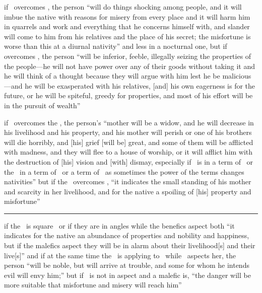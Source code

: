 \begin{description}[style=multiline,leftmargin=1.5cm]
\item[\Mars\Square\Mercury] if \Mars\, overcomes \Mercury, the person ``will do things shocking among people, and it will imbue the native with reasons for misery from every place and it will harm him in quarrels and work and everything that he concerns himself with, and slander will come to him from his relatives and the place of his secret; the misfortune is worse than this at a diurnal nativity'' and less in a nocturnal one, but if \Mercury\, overcomes \Mars, the person ``will be inferior, feeble, illegally seizing the properties of the people---he will not have power over any of their goods without taking it and he will think of a thought because they will argue with him lest he be malicious---and he will be exasperated with his relatives, [and] his own eagerness is for the future, or he will be spiteful, greedy for properties, and most of his effort will be in the pursuit of wealth''

\item[\Mars\Square\Moon] if \Mars\, overcomes the \Moon, the person's ``mother will be a widow, and he will decrease in his livelihood and his property, and his mother will perish or one of his brothers will die horribly, and [his] grief [will be] great, and some of them will be afflicted with madness, and they will flee to a house of worship, or it will afflict him with the destruction of [his] vision and [with] dismay, especially if \Mars\, is in a term of \Saturn\, or the \Moon\, in a term of \Mercury\, or a term of \Mars\, as sometimes the power of the terms changes nativities'' but if the \Moon\, overcomes \Mars, ``it indicates the small standing of his mother and scarcity in her livelihood, and for the native a spoiling of [his] property and misfortune''

\vspace{0.5em}\hrule
\item[\Sun\Square\Moon] if the \Sun\, is square \Moon\, or if they are in angles while the benefics aspect both ``it indicates for the native an abundance of properties and nobility and happiness, but if the malefics aspect they will be in alarm about their livelihood[s] and their live[s]'' and if at the same time the \Moon\, is applying to \Jupiter\, while \Jupiter\, aspects her, the person ``will be noble, but will arrive at trouble, and some for whom he intends evil will envy him;'' but if \Jupiter\, is not in aspect and a malefic is, ``the danger will be more suitable that misfortune and misery will reach 
him''


\end{description}

